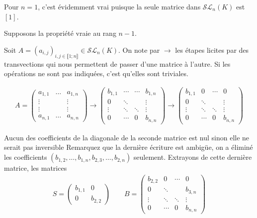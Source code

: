 \documentclass{article}
\begin{document}
Pour $n = 1$, c'est évidemment vrai puisque la seule matrice dans $\mathcal{S}\mathcal{L}_n(K)$ est $[1]$.

Supposons la propriété vraie au rang $n-1$. 

Soit $A=(a_{i,j})_{i,j\in\llbracket 1;n\rrbracket} \in\mathcal{S}\mathcal{L}_n(K)$. On note par $\rightarrow$ les étapes licites par des transvections qui nous permettent de passer d'une matrice à l'autre. Si les opérations ne sont pas indiquées, c'est qu'elles sont triviales. 

\begin{align*}
A = \begin{pmatrix}a_{1,1}&\ldots&a_{1,n}\\
\vdots & & \vdots\\
\vdots & & \vdots\\
a_{n,1}& \ldots & a_{n,n}\end{pmatrix} \rightarrow
\begin{pmatrix}
b_{1,1} & \cdots & \cdots & b_{1,n} \\
0 & \ddots & & \vdots \\
\vdots & \ddots & \ddots & \vdots \\
0 & \cdots & 0 & b_{n,n}
\end{pmatrix}\rightarrow
\begin{pmatrix}
b_{1,1} & 0 & \cdots & 0 \\
0 & \ddots & & \vdots \\
\vdots & \ddots & \ddots & \vdots \\
0 & \cdots & 0 & b_{n,n}
\end{pmatrix}
\end{align*} 

Aucun des coefficients de la diagonale de la seconde matrice est nul sinon elle ne serait pas inversible Remarquez que la dernière écriture est ambigüe, on a éliminé les coefficients $(b_{1,2},\ldots, b_{1,n},b_{2,3},\ldots, b_{2,n})$ seulement. Extrayons de cette dernière matrice, les matrices
\begin{align*}
S = \begin{pmatrix}
b_{1,1}&0\\
0&b_{2,2}
\end{pmatrix}
\qquad
B = \begin{pmatrix}
b_{2,2} & 0 &\cdots  & 0 \\
0 & \ddots & & b_{3,n} \\
\vdots & \ddots & \ddots & \vdots \\
0 & \cdots & 0 & b_{n,n}
\end{pmatrix}
\end{align*}
\end{document}
